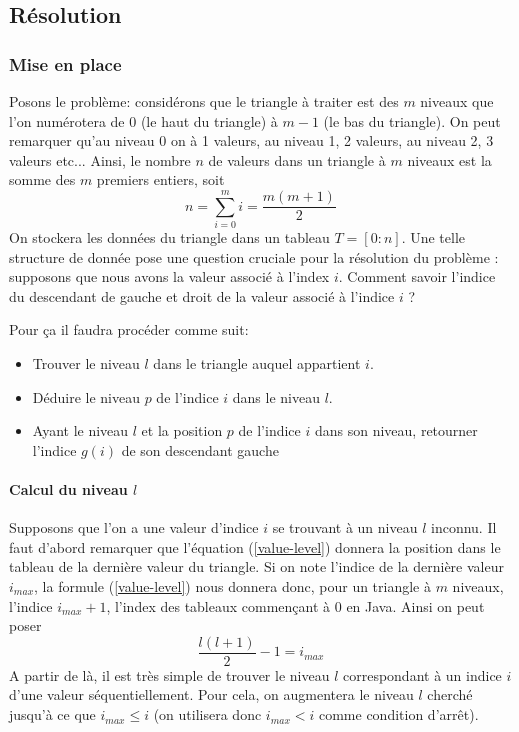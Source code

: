 \documentclass[a4paper,english,french]{article}
\begin{document}
\subsection*{Résolution}

\subsubsection*{Mise en place}

Posons le problème: considérons que le triangle à traiter est des $m$ niveaux que l'on numérotera de $0$ (le haut du triangle) à $m - 1$ (le bas du triangle). On peut remarquer qu'au niveau 0 on à 1 valeurs, au niveau 1, 2 valeurs, au niveau 2, 3 valeurs etc... Ainsi, le nombre $n$ de valeurs dans un triangle à $m$ niveaux est la somme des $m$ premiers entiers, soit
\begin{equation} \label{value-level}
n = \sum_{i=0}^m i = \frac{m(m+1)}{2}
\end{equation}
On stockera les données du triangle dans un tableau $T = [0 : n]$. Une telle structure de donnée pose une question cruciale pour la résolution du problème : supposons que nous avons la valeur associé à l'index $i$. Comment savoir l'indice du descendant de gauche et droit de la valeur associé à l'indice $i$ ?

Pour ça il faudra procéder comme suit:
\begin{itemize}
\item Trouver le niveau $l$ dans le triangle auquel appartient $i$.
\item Déduire le niveau $p$ de l'indice $i$ dans le niveau $l$.
\item Ayant le niveau $l$ et la position $p$ de l'indice $i$ dans son niveau, retourner l'indice $g(i)$ de son
descendant gauche
\end{itemize}

\paragraph*{Calcul du niveau $l$} Supposons que l'on a une valeur d'indice $i$ se trouvant à un niveau $l$ inconnu. Il faut d'abord remarquer que l'équation (\ref{value-level}) donnera la position dans le tableau de la dernière valeur du triangle.
Si on note l'indice de la dernière valeur $i_{max}$, la formule (\ref{value-level}) nous donnera donc, pour un triangle à $m$ niveaux, l'indice $i_{max} + 1$, l'index des tableaux commençant à 0 en Java. Ainsi on peut poser \[ \frac{l(l+1)}{2} - 1 = i_{max} \]
A partir de là, il est très simple de trouver le niveau $l$ correspondant à un indice $i$ d'une valeur séquentiellement. Pour cela, on augmentera le niveau $l$ cherché jusqu'à ce que $i_{max} \leq i$ (on utilisera donc $i_{max} < i$ comme condition d'arrêt).
\end{document}
